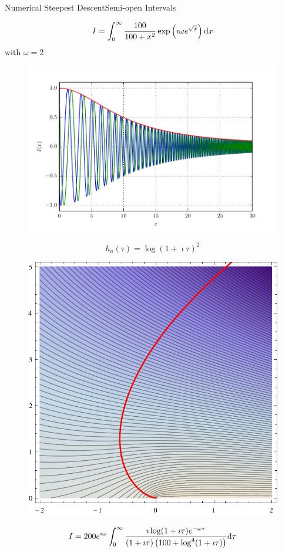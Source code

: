 \documentclass{beamer}
\begin{document}
\begin{frame}{Numerical Steepest Descent}{Semi-open Intervals}
  \begin{minipage}{0.49\linewidth}
    \begin{equation*}
      I = \int_0^\infty \frac{100}{100 + x^2} \exp\left(\imath \omega e^{\sqrt{x}}\right) \mathrm{d}x
    \end{equation*}
    with $\omega = 2$
    \begin{figure}
      \centering
      \includegraphics[width=\linewidth]{./fig/oscillatory_example_semiopen.pdf}
    \end{figure}
  \end{minipage}
  \begin{minipage}{0.49\linewidth}
    \begin{equation*}
      h_a(\tau) = \log(1 + \imath\tau)^2
    \end{equation*}
    \begin{figure}
      \centering
      \includegraphics[width=0.6\linewidth]{./fig/oscillatory_example_semiopen_path.pdf}
    \end{figure}
    \scriptsize
    \begin{equation*}
      I = 200 e^{\imath\omega}
          \int_0^{\infty}
            \frac{\imath \log(1+\imath\tau) e^{-\omega\tau}}
                 {(1 + \imath\tau)\left(100+\log^4(1+\imath\tau)\right)}
          \mathrm{d}\tau
    \end{equation*}
  \end{minipage}
\end{frame}
\end{document}
